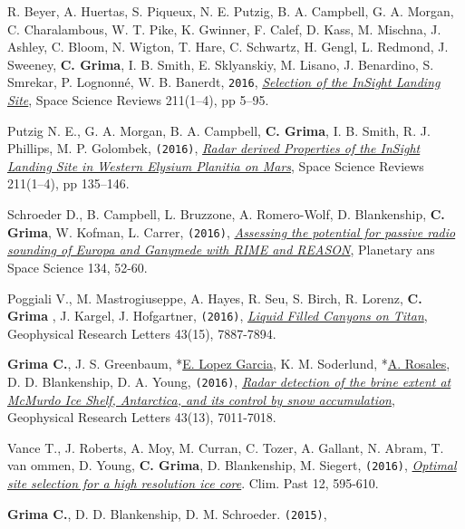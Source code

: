 \begin{etaremune}
  R. Beyer, A. Huertas, S. Piqueux, N. E. Putzig, B. A. Campbell, G. A.
  Morgan, C. Charalambous, W. T. Pike, K. Gwinner, F. Calef, D. Kass, M.
  Mischna, J. Ashley, C. Bloom, N. Wigton, T. Hare, C. Schwartz, H.
  Gengl, L. Redmond, J. Sweeney, \textbf{C. Grima}, I. B. Smith, E.
  Sklyanskiy, M. Lisano, J. Benardino, S. Smrekar, P. Lognonné, W. B.
  Banerdt, \texttt{2016},
  \href{http://link.springer.com/article/10.1007/s11214-016-0321-9?wt_mc=Internal.Event.1.SEM.ArticleAuthorOnlineFirst}{\emph{Selection
  of the InSight Landing Site}}, Space Science Reviews 211(1–4), pp 5–95.
\item
  Putzig N. E., G. A. Morgan, B. A. Campbell, \textbf{C. Grima}, I. B.
  Smith, R. J. Phillips, M. P. Golombek, \texttt{(2016)},
  \href{http://link.springer.com/article/10.1007\%2Fs11214-016-0322-8}{\emph{Radar
  derived Properties of the InSight Landing Site in Western Elysium
  Planitia on Mars}}, Space Science Reviews 211(1–4), pp 135–146.
\item
  Schroeder D., B. Campbell, L. Bruzzone, A. Romero-Wolf, D.
  Blankenship, \textbf{C. Grima}, W. Kofman, L. Carrer, \texttt{(2016)},
  \href{http://www.sciencedirect.com/science/article/pii/S0032063316301465}{\emph{Assessing
  the potential for passive radio sounding of Europa and Ganymede with
  RIME and REASON}}, Planetary ans Space Science 134,  52-60.
\item
  Poggiali V., M. Mastrogiuseppe, A. Hayes, R. Seu, S. Birch, R. Lorenz,
  \textbf{C. Grima }, J. Kargel, J. Hofgartner, \texttt{(2016)},
  \href{http://onlinelibrary.wiley.com/doi/10.1002/2016GL069679/abstract}{\emph{Liquid
  Filled Canyons on Titan}}, Geophysical Research Letters 43(15), 7887-7894.
\item
  \textbf{Grima C.}, J. S. Greenbaum, *\underline{E. Lopez Garcia}, K.
  M. Soderlund, *\underline{A. Rosales}, D. D. Blankenship, D. A. Young,
  \texttt{(2016)},
  \href{http://onlinelibrary.wiley.com/doi/10.1002/2016GL069524/pdf}{\emph{Radar
  detection of the brine extent at McMurdo Ice Shelf, Antarctica, and
  its control by snow accumulation}}, Geophysical Research Letters 43(13), 7011-7018.
\item
  Vance T., J. Roberts, A. Moy, M. Curran, C. Tozer, A. Gallant, N.
  Abram, T. van ommen, D. Young, \textbf{C. Grima}, D. Blankenship, M.
  Siegert, \texttt{(2016)},
  \href{http://www.clim-past.net/12/595/2016/cp-12-595-2016.pdf}{\emph{Optimal
  site selection for a high resolution ice core}}. Clim. Past 12,
  595-610.
\item
  \textbf{Grima C.}, D. D. Blankenship, D. M. Schroeder. \texttt{(2015)},

\end{etaremune}
